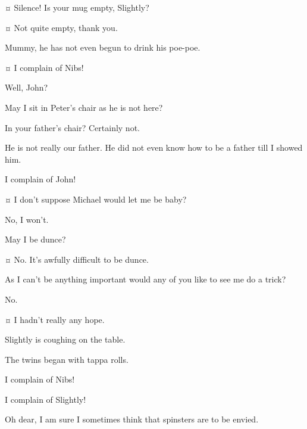\begin{drama}

\wendyspeaks {}¤
Silence!
Is your mug empty, Slightly?

\slightlyspeaks {}¤
Not quite empty, thank you.

\nibsspeaks
Mummy, he has not even begun to drink his poe-poe.

\slightlyspeaks {}¤
I complain of Nibs!


\wendyspeaks
Well, John?

\johnspeaks
May I sit in Peter’s chair as he is not here?

\wendyspeaks
In your father’s chair?
Certainly not.

\johnspeaks
He is not really our father.
He did not even know how to be a father till I showed him.


\secondtwinspeaks
I complain of John!


\tootlesspeaks {}¤
I don’t suppose Michael would let me be baby?

\michaelspeaks
No, I won’t.

\tootlesspeaks
May I be dunce?

\firsttwinspeaks {}¤
No.
It’s awfully difficult to be dunce.

\tootlesspeaks
As I can’t be anything important would any of you like to see me do a trick?

No.

\tootlesspeaks {}¤
I hadn’t really any hope.


\nibsspeaks
Slightly is coughing on the table.

\curlyspeaks
The twins began with tappa rolls.

\slightlyspeaks
I complain of Nibs!

\nibsspeaks
I complain of Slightly!

\wendyspeaks
Oh dear, I am sure I sometimes think that spinsters are to be envied.


\end{drama}
